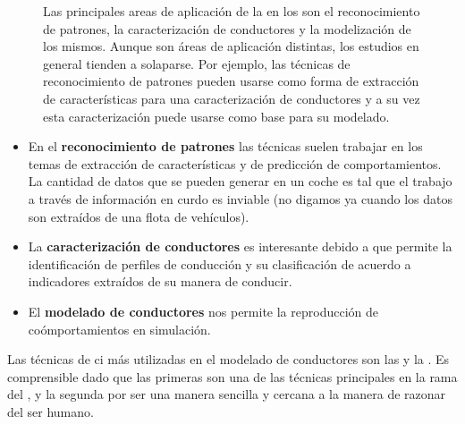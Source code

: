 \begin{figure}[t]
	\centering
	\caption[Principales areas de aplicación de la \acrshort{ci} en los \acrshort{its}]{Las principales areas de aplicación de la  en los  son el reconocimiento de patrones, la caracterización de conductores y la modelización de los mismos. Aunque son áreas de aplicación distintas, los estudios en general tienden a solaparse. Por ejemplo, las técnicas de reconocimiento de patrones pueden usarse como forma de extracción de características para una caracterización de conductores y a su vez esta caracterización puede usarse como base para su modelado.}
	\label{fig:main-applications-of-ci-in-its}
\end{figure}

\begin{itemize}
	\item En el \textbf{reconocimiento de patrones} las técnicas suelen trabajar en los temas de extracción de características y de predicción de comportamientos. La cantidad de datos que se pueden generar en un coche es tal que el trabajo a través de información en curdo es inviable (no digamos ya cuando los datos son extraídos de una flota de vehículos).
	\item La \textbf{caracterización de conductores} es interesante debido a que permite la identificación de perfiles de conducción y su clasificación de acuerdo a indicadores extraídos de su manera de conducir.
	\item El \textbf{modelado de conductores} nos permite la reproducción de coómportamientos en simulación.
\end{itemize}

Las técnicas de \gls{ci} más utilizadas en el modelado de conductores son las  y la . Es comprensible dado que las primeras son una de las técnicas principales en la rama del , y la segunda por ser una manera sencilla y cercana a la manera de razonar del ser humano.


